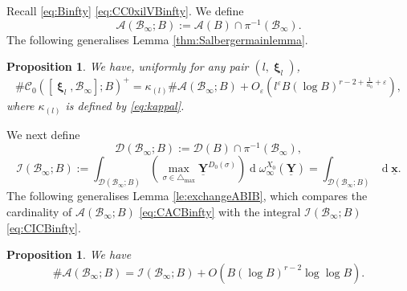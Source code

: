 \documentclass[11pt,letterpaper]{amsart}
\newcommand{\CA}{{\mathcal {A}}}
\newcommand{\CB}{{\mathcal {B}}}
\newcommand{\CC}{{\mathcal {C}}}
\newcommand{\CD}{{\mathcal {D}}}
\newcommand{\CI}{{\mathcal {I}}}
\newcommand{\xx}{\underline{\mathbf{x}}}
\newcommand{\YY}{\underline{\mathbf{Y}}}
\DeclareMathOperator{\bxi}{\mathbf{\xi}}
\theoremstyle{plain}
\numberwithin{equation}{section}
\newtheorem{proposition}[theorem]{Proposition}
\theoremstyle{definition}
\theoremstyle{remark}
\begin{document}
Recall \eqref{eq:Binfty} \eqref{eq:CC0xilVBinfty}. We define 
\begin{equation}\label{eq:CACBinfty}
	\CA(\CB_\infty;B):=\CA(B)\cap \pi^{-1}(\CB_\infty).
\end{equation} The following generalises  Lemma \ref{thm:Salbergermainlemma}.
\begin{proposition}\label{prop:eqdistCAinftyB}
We have, uniformly for any pair $(l,\bxi_l)$,
$$\#\CC_0([\bxi_l,\CB_\infty];B)^+=\kappa_{(l)}\#\CA(\CB_\infty;B)+O_\varepsilon\left(l^\varepsilon B(\log B)^{r-2+\frac{1}{\alpha_0}+\varepsilon}\right),$$
where $\kappa_{(l)}$ is defined by \eqref{eq:kappal}.
\end{proposition}
We next define
\begin{equation}\label{eq:CDCBinfty}
	\CD(\CB_\infty;B):=\CD(B)\cap \pi^{-1}(\CB_\infty),
\end{equation}
\begin{equation}\label{eq:CICBinfty}
	\CI(\CB_\infty;B):=\int_{\CD(\CB_\infty;B)}\left(\max_{\sigma\in\triangle_{\max}}\YY^{D_0(\sigma)}\right)\operatorname{d}\omega^{X_0}_{\infty}(\YY)=\int_{\CD(\CB_\infty;B)}\operatorname{d}\xx. 
\end{equation}
The following generalises Lemma \ref{le:exchangeABIB}, which compares the cardinality of $\CA(\CB_\infty;B)$ \eqref{eq:CACBinfty} with the integral $\CI(\CB_\infty;B)$ \eqref{eq:CICBinfty}. 
\begin{proposition}\label{co:CAsigmaWBCDWsigmaB}
	We have $$\#\CA(\CB_\infty;B)=\CI(\CB_\infty;B)+O(B(\log B)^{r-2}\log\log B).$$
\end{proposition}
\end{document}
